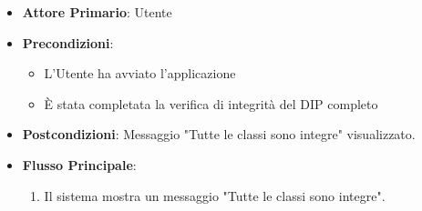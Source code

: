 \begin{itemize}
    \item \textbf{Attore Primario}: Utente
    \item \textbf{Precondizioni}: 
        \begin{itemize}
            \item L'Utente ha avviato l'applicazione
            \item È stata completata la verifica di integrità del DIP completo
        \end{itemize}
    \item \textbf{Postcondizioni}: Messaggio "Tutte le classi sono integre" visualizzato.
    \item \textbf{Flusso Principale}:
        \begin{enumerate}
            \item Il sistema mostra un messaggio "Tutte le classi sono integre".
        \end{enumerate}
\end{itemize}

